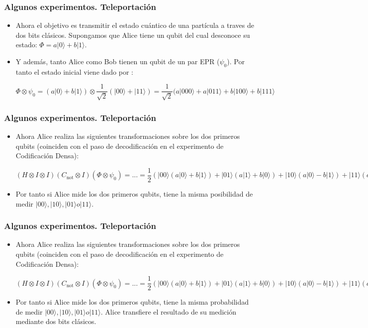 \documentclass{beamer}
\newcommand{\base}[1]{|#1\rangle}
\newcommand{\cnot}{C_{\mathrm{not}}}
\begin{document}
\begin{frame}
	\frametitle{Algunos experimentos. Teleportación}
	\begin{itemize}
	\item Ahora el objetivo es transmitir el estado cuántico de una partícula a traves de dos bits clásicos. Supongamos que Alice tiene un qubit del cual desconoce su estado: $\Phi = a\base0 + b\base1$.
	\item Y además, tanto Alice como Bob tienen un qubit de un par EPR ($\psi_0$). Por tanto el estado inicial viene dado por : \\ 
	\begin{center}
	$\Phi \otimes \psi_0 =  (a\base0 + b\base1) \otimes\dfrac{1}{\sqrt{2}}(\base{00} + \base{11}) = \dfrac{1}{\sqrt{2}} (a\base{000} + a\base{011} + b\base{100} + b\base{111}$
	\end{center}
	\end{itemize}
\end{frame}

\begin{frame}
	\frametitle{Algunos experimentos. Teleportación}
	\begin{itemize}
	\item Ahora Alice realiza las siguientes transformaciones sobre los dos primeros qubits (coinciden con el paso de decodificación en el experimento de Codificación Densa):
	\begin{center}
	$ (H \otimes I \otimes I)(\cnot \otimes I) (\Phi \otimes \psi_0) = ... = \dfrac{1}{2}(\base{00}(a\base0 + b\base1) + \base{01}(a\base1 + b\base0) + \base{10}(a\base0 - b\base1) + 
	\base{11}(a\base1 - b\base0)) $
	\end{center}
	\item Por tanto si Alice mide los dos primeros qubits, tiene la misma posibilidad de medir $\base{00}, \base{10}, \base{01} o \base{11}$.
	\end{itemize}
\end{frame}

\begin{frame}
	\frametitle{Algunos experimentos. Teleportación}
	\begin{itemize}
	\item Ahora Alice realiza las siguientes transformaciones sobre los dos primeros qubits (coinciden con el paso de decodificación en el experimento de Codificación Densa):
	\begin{center}
	$ (H \otimes I \otimes I)(\cnot \otimes I) (\Phi \otimes \psi_0) = ... = \dfrac{1}{2}(\base{00}(a\base0 + b\base1) + \base{01}(a\base1 + b\base0) + \base{10}(a\base0 - b\base1) + 
	\base{11}(a\base1 - b\base0)) $ 
	\end{center}
	\item Por tanto si Alice mide los dos primeros qubits, tiene la misma probabilidad de medir $\base{00}, \base{10}, \base{01} o \base{11}$. Alice transfiere el resultado de su medición mediante 		dos bits clásicos.
	\end{itemize}
\end{frame}
\end{document}
